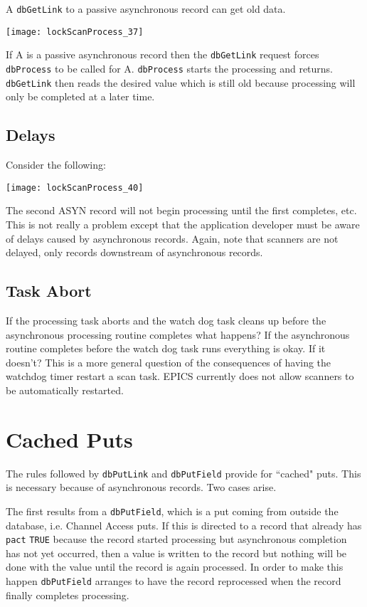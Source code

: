 A \verb|dbGetLink| to a passive asynchronous record can get old data.

\begin{center}
\texttt{[image: lockScanProcess\_37]}
\end{center}

If A is a passive asynchronous record then the \verb|dbGetLink| request forces \verb|dbProcess| to be called for A. \verb|dbProcess| 
starts the processing and returns. \verb|dbGetLink| then reads the desired value which is still old because processing will only 
be completed at a later time.

\subsection{Delays}

Consider the following:

\begin{center}
\texttt{[image: lockScanProcess\_40]}
\end{center}

The second ASYN record will not begin processing until the first completes, etc. This is not really a problem except that 
the application developer must be aware of delays caused by asynchronous records. Again, note that scanners are not 
delayed, only records downstream of asynchronous records. 

\subsection{Task Abort}

If the processing task aborts and the watch dog task cleans up before the asynchronous processing routine completes what 
happens? If the asynchronous routine completes before the watch dog task runs everything is okay. If it doesn't? This is a 
more general question of the consequences of having the watchdog timer restart a scan task. EPICS currently does not 
allow scanners to be automatically restarted. 

\section{Cached Puts}

The rules followed by \verb|dbPutLink| and \verb|dbPutField| provide for ``cached" puts. This is necessary because of 
asynchronous records. Two cases arise.

The first results from a \verb|dbPutField|, which is a put coming from outside the database, i.e. Channel Access puts. If this 
is directed to a record that already has \verb|pact| \verb|TRUE| because the record started processing but asynchronous completion 
has not yet occurred, then a value is written to the record but nothing will be done with the value until the record is again 
processed. In order to make this happen \verb|dbPutField| arranges to have the record reprocessed when the record finally 
completes processing.


